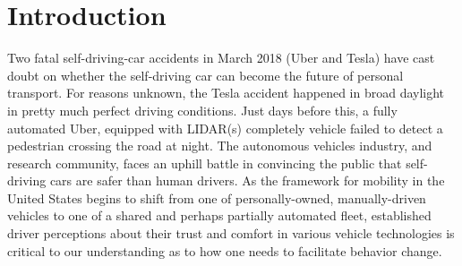 \section{Introduction}
\label{sec:introduction}


Two fatal self-driving-car accidents in March 2018 (Uber and Tesla) have cast doubt on whether the self-driving car can become the future of personal transport. 
For reasons unknown, the Tesla accident happened in broad daylight in pretty much perfect driving conditions. Just days before this, a fully automated Uber, equipped with LIDAR(s) completely vehicle failed to detect a pedestrian crossing the road at night. 
The autonomous vehicles industry, and research community, faces an uphill battle in convincing the public that self-driving cars are safer than human drivers.
As the framework for mobility in the United States begins to shift from one of personally-owned, manually-driven vehicles to one of a shared and perhaps partially automated fleet, established driver perceptions about their trust and comfort in various vehicle technologies is critical to our understanding as to how one needs to facilitate behavior change.

